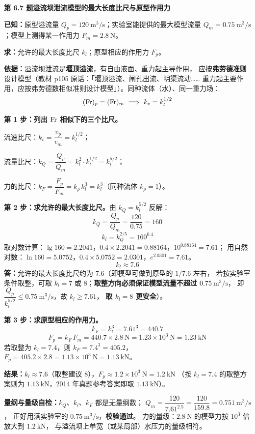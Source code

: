 \noindent\textbf{第 6.7 题\quad 溢流坝泄流模型的最大长度比尺与原型作用力}

\begin{jie}
\textbf{已知：}原型溢流量 $Q_p=120\ \mathrm{m^{3}/s}$；实验室能提供的最大模型流量
$Q_m=0.75\ \mathrm{m^{3}/s}$；模型上测得某一作用力 $F_m=2.8\ \mathrm{N}$。

\textbf{求：}允许的最大长度比尺 $k_l$；原型相应的作用力 $F_p$。

\textbf{依据：}溢流坝泄流是\textbf{堰顶溢流}，有自由液面、重力起主导作用，
应按\textbf{弗劳德准则}设计模型（教材 p105 原话：「堰顶溢流、闸孔出流、明渠流动……
重力起主要作用，应按弗劳德数相似准则设计模型」）。同种流体（水）、同一重力场：
\[ (\Fr)_p=(\Fr)_m\ \Longrightarrow\ k_v=k_l^{1/2} \]

\textbf{第 1 步：列出 $\mathrm{Fr}$ 相似下的三个比尺。}
\begin{xiaowen}
\item 流速比尺：$k_v=\dfrac{v_p}{v_m}=k_l^{1/2}$；
\item 流量比尺：$k_Q=\dfrac{Q_p}{Q_m}=k_l^{2}\cdot k_l^{1/2}=k_l^{5/2}$；
\item 力的比尺：$k_F=\dfrac{F_p}{F_m}=k_\rho\,k_l^{3}=k_l^{3}$（同种流体 $k_\rho=1$）。
\end{xiaowen}

\textbf{第 2 步：求允许的最大长度比尺。}由 $k_Q=k_l^{5/2}$ 反解：
\[ k_Q=\frac{Q_p}{Q_m}=\frac{120}{0.75}=160 \]
\[ k_l=k_Q^{2/5}=160^{0.4} \]
取对数计算：$\lg160=2.2041$，$0.4\times2.2041=0.88164$，$10^{0.88164}=7.61$；
用自然对数：$\ln160=5.0752$，$0.4\times5.0752=2.0301$，$e^{2.0301}=7.61$。
\[ \boxed{k_l\approx7.6} \]
\textbf{答：}允许的最大长度比尺约为 $7.6$（即模型可做到原型的 $1/7.6$ 左右，
若按实验室条件取整，可取 $k_l=7$ 或 $8$；\textbf{取整方向必须保证模型流量不超过 $0.75\ \mathrm{m^{3}/s}$}，
即 $\dfrac{Q_p}{k_l^{5/2}}\le0.75\ \mathrm{m^{3}/s}$，故 $k_l\ge7.61$，
\textbf{取 $k_l=8$ 更安全}）。

\textbf{第 3 步：求原型相应的作用力。}
\[ k_F=k_l^{3}=7.61^{3}=440.7 \]
\[ F_p=k_F\,F_m=440.7\times2.8\ \mathrm{N}=1.23\times10^{3}\ \mathrm{N}
   =1.23\ \mathrm{kN} \]
若取整为 $k_l=7.4$，则 $k_F=7.4^{3}=405.2$，$F_p=405.2\times2.8=1.13\times10^{3}\ \mathrm{N}=1.13\ \mathrm{kN}$。

\textbf{结果：}$k_l\approx7.6$（取整建议 $8$），$F_p\approx1.2\times10^{3}\ \mathrm{N}=1.2\ \mathrm{kN}$
（按 $k_l=7.4$ 的取整方案则为 $1.13\ \mathrm{kN}$，2014 年真题参考答案即取 $1.13\ \mathrm{kN}$）。

\textbf{量纲与量级自检：}$k_Q$、$k_l$、$k_F$ 都是无量纲数；
$Q_m=\dfrac{120}{7.61^{2.5}}=\dfrac{120}{159.8}=0.751\ \mathrm{m^{3}/s}$，
正好用满实验室的 $0.75\ \mathrm{m^{3}/s}$，\textbf{校验通过}。
力的量级：$2.8\ \mathrm{N}$ 的模型力按 $10^{3}$ 倍放大到 $1.2\ \mathrm{kN}$，
与溢流坝上单宽（或某局部）水压力的量级相符。
\end{jie}

